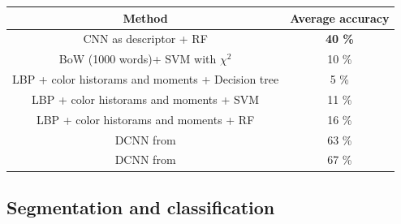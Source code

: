 \documentclass[aspectratio=169]{beamer}
\newenvironment{myframe}[1][t]{\begin{frame}[#1]{\secname}{\subsecname}}{\end{frame}}
\begin{document}
    \begin{myframe}
          \begin{center}
              \renewcommand{\arraystretch}{1.3} %
              \begin{tabulary}{\textwidth}{|| c | C||}
                  \hline
                  Method & Average accuracy \\
                  \hline\hline
                  CNN as descriptor + RF & \textbf{40 \%} \\ 
                  \hline
                  BoW (1000 words)+ SVM with $\chi^2$ & 10 \% \\ %
                  \hline
                  LBP + color historams and moments + Decision tree & 5 \% \\ 
                  \hline
                  LBP + color historams and moments + SVM & 11 \% \\ %
                  \hline
                  LBP + color historams and moments + RF & 16 \% \\ %
                  \hline
                  \hline
                  DCNN from \cite{Bolanos2016} & 63 \%\\
                  \hline 
                  DCNN from \cite{Yanai2015} & 67 \%\\
                  \hline 
                \end{tabulary}
            \end{center}
    \end{myframe}
    
    \subsection{Segmentation and classification}
    
\end{document}
